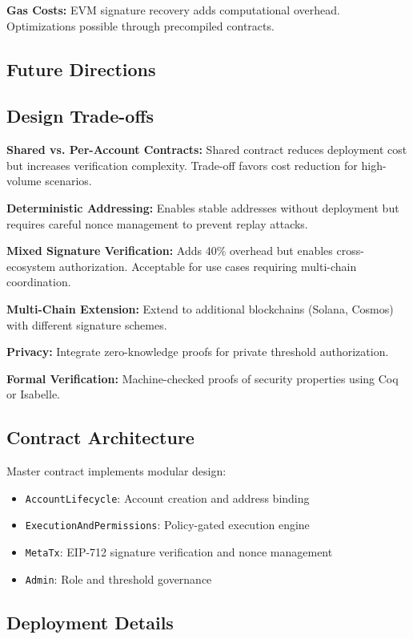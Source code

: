 \documentclass[10pt,twocolumn]{article}
\begin{document}
{\textbf{Gas Costs:} EVM signature recovery adds computational overhead. Optimizations possible through precompiled contracts.

\subsection{Future Directions}

\subsection{Design Trade-offs}

\textbf{Shared vs. Per-Account Contracts:} Shared contract reduces deployment cost but increases verification complexity. Trade-off favors cost reduction for high-volume scenarios.

\textbf{Deterministic Addressing:} Enables stable addresses without deployment but requires careful nonce management to prevent replay attacks.

\textbf{Mixed Signature Verification:} Adds 40\% overhead but enables cross-ecosystem authorization. Acceptable for use cases requiring multi-chain coordination.


\textbf{Multi-Chain Extension:} Extend to additional blockchains (Solana, Cosmos) with different signature schemes.

\textbf{Privacy:} Integrate zero-knowledge proofs for private threshold authorization.

\textbf{Formal Verification:} Machine-checked proofs of security properties using Coq or Isabelle.


\subsection{Contract Architecture}

Master contract implements modular design:
\begin{itemize}[leftmargin=*,topsep=2pt,itemsep=1pt]
\item \texttt{AccountLifecycle}: Account creation and address binding
\item \texttt{ExecutionAndPermissions}: Policy-gated execution engine
\item \texttt{MetaTx}: EIP-712 signature verification and nonce management
\item \texttt{Admin}: Role and threshold governance
\end{itemize}

\subsection{Deployment Details}

}
\end{document}
